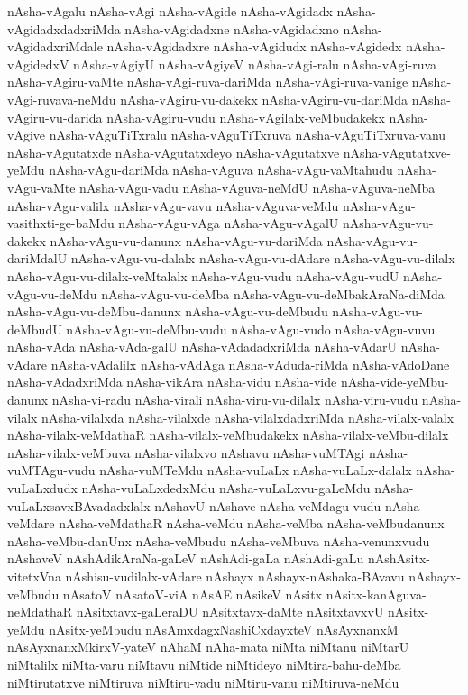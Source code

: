 {nAsha-vAgalu
nAsha-vAgi
nAsha-vAgide
nAsha-vAgidadx
nAsha-vAgidadxdadxriMda
nAsha-vAgidadxne
nAsha-vAgidadxno
nAsha-vAgidadxriMdale
nAsha-vAgidadxre
nAsha-vAgidudx
nAsha-vAgidedx
nAsha-vAgidedxV
nAsha-vAgiyU
nAsha-vAgiyeV
nAsha-vAgi-ralu
nAsha-vAgi-ruva
nAsha-vAgiru-vaMte
nAsha-vAgi-ruva-dariMda
nAsha-vAgi-ruva-vanige
nAsha-vAgi-ruvava-neMdu
nAsha-vAgiru-vu-dakekx
nAsha-vAgiru-vu-dariMda
nAsha-vAgiru-vu-darida
nAsha-vAgiru-vudu
nAsha-vAgilalx-veMbudakekx
nAsha-vAgive
nAsha-vAguTiTxralu
nAsha-vAguTiTxruva
nAsha-vAguTiTxruva-vanu
nAsha-vAgutatxde
nAsha-vAgutatxdeyo
nAsha-vAgutatxve
nAsha-vAgutatxve-yeMdu
nAsha-vAgu-dariMda
nAsha-vAguva
nAsha-vAgu-vaMtahudu
nAsha-vAgu-vaMte
nAsha-vAgu-vadu
nAsha-vAguva-neMdU
nAsha-vAguva-neMba
nAsha-vAgu-valilx
nAsha-vAgu-vavu
nAsha-vAguva-veMdu
nAsha-vAgu-vasithxti-ge-baMdu
nAsha-vAgu-vAga
nAsha-vAgu-vAgalU
nAsha-vAgu-vu-dakekx
nAsha-vAgu-vu-danunx
nAsha-vAgu-vu-dariMda
nAsha-vAgu-vu-dariMdalU
nAsha-vAgu-vu-dalalx
nAsha-vAgu-vu-dAdare
nAsha-vAgu-vu-dilalx
nAsha-vAgu-vu-dilalx-veMtalalx
nAsha-vAgu-vudu
nAsha-vAgu-vudU
nAsha-vAgu-vu-deMdu
nAsha-vAgu-vu-deMba
nAsha-vAgu-vu-deMbakAraNa-diMda
nAsha-vAgu-vu-deMbu-danunx
nAsha-vAgu-vu-deMbudu
nAsha-vAgu-vu-deMbudU
nAsha-vAgu-vu-deMbu-vudu
nAsha-vAgu-vudo
nAsha-vAgu-vuvu
nAsha-vAda
nAsha-vAda-galU
nAsha-vAdadadxriMda
nAsha-vAdarU
nAsha-vAdare
nAsha-vAdalilx
nAsha-vAdAga
nAsha-vAduda-riMda
nAsha-vAdoDane
nAsha-vAdadxriMda
nAsha-vikAra
nAsha-vidu
nAsha-vide
nAsha-vide-yeMbu-danunx
nAsha-vi-radu
nAsha-virali
nAsha-viru-vu-dilalx
nAsha-viru-vudu
nAsha-vilalx
nAsha-vilalxda
nAsha-vilalxde
nAsha-vilalxdadxriMda
nAsha-vilalx-valalx
nAsha-vilalx-veMdathaR
nAsha-vilalx-veMbudakekx
nAsha-vilalx-veMbu-dilalx
nAsha-vilalx-veMbuva
nAsha-vilalxvo
nAshavu
nAsha-vuMTAgi
nAsha-vuMTAgu-vudu
nAsha-vuMTeMdu
nAsha-vuLaLx
nAsha-vuLaLx-dalalx
nAsha-vuLaLxdudx
nAsha-vuLaLxdedxMdu
nAsha-vuLaLxvu-gaLeMdu
nAsha-vuLaLxsavxBAvadadxlalx
nAshavU
nAshave
nAsha-veMdagu-vudu
nAsha-veMdare
nAsha-veMdathaR
nAsha-veMdu
nAsha-veMba
nAsha-veMbudanunx
nAsha-veMbu-danUnx
nAsha-veMbudu
nAsha-veMbuva
nAsha-venunxvudu
nAshaveV
nAshAdikAraNa-gaLeV
nAshAdi-gaLa
nAshAdi-gaLu
nAshAsitx-vitetxVna
nAshisu-vudilalx-vAdare
nAshayx
nAshayx-nAshaka-BAvavu
nAshayx-veMbudu
nAsatoV
nAsatoV-viA
nAsAE
nAsikeV
nAsitx
nAsitx-kanAguva-neMdathaR
nAsitxtavx-gaLeraDU
nAsitxtavx-daMte
nAsitxtavxvU
nAsitx-yeMdu
nAsitx-yeMbudu
nAsAmxdagxNashiCxdayxteV
nAsAyxnanxM
nAsAyxnanxMkirxV-yateV
nAhaM
nAha-mata
niMta
niMtanu
niMtarU
niMtalilx
niMta-varu
niMtavu
niMtide
niMtideyo
niMtira-bahu-deMba
niMtirutatxve
niMtiruva
niMtiru-vadu
niMtiru-vanu
niMtiruva-neMdu
}
